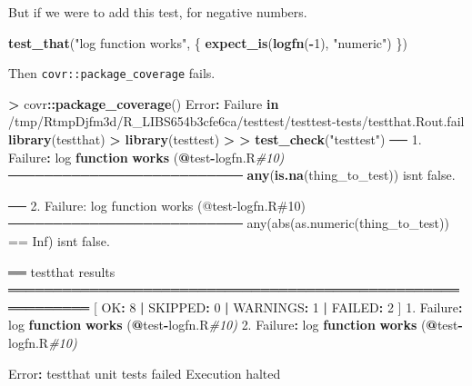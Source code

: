 \documentclass[
]{article}
\newenvironment{Shaded}{\begin{snugshade}}{\end{snugshade}}
\newcommand{\CommentTok}[1]{\textcolor[rgb]{0.56,0.35,0.01}{\textit{#1}}}
\newcommand{\ControlFlowTok}[1]{\textcolor[rgb]{0.13,0.29,0.53}{\textbf{#1}}}
\newcommand{\DataTypeTok}[1]{\textcolor[rgb]{0.13,0.29,0.53}{#1}}
\newcommand{\DecValTok}[1]{\textcolor[rgb]{0.00,0.00,0.81}{#1}}
\newcommand{\ErrorTok}[1]{\textcolor[rgb]{0.64,0.00,0.00}{\textbf{#1}}}
\newcommand{\FloatTok}[1]{\textcolor[rgb]{0.00,0.00,0.81}{#1}}
\newcommand{\KeywordTok}[1]{\textcolor[rgb]{0.13,0.29,0.53}{\textbf{#1}}}
\newcommand{\NormalTok}[1]{#1}
\newcommand{\OperatorTok}[1]{\textcolor[rgb]{0.81,0.36,0.00}{\textbf{#1}}}
\newcommand{\StringTok}[1]{\textcolor[rgb]{0.31,0.60,0.02}{#1}}
\begin{document}
But if we were to add this test, for negative numbers.

\begin{Shaded}
\begin{Highlighting}[]
\KeywordTok{test\_that}\NormalTok{(}\StringTok{"log function works"}\NormalTok{, \{}
  \KeywordTok{expect\_is}\NormalTok{(}\KeywordTok{logfn}\NormalTok{(}\OperatorTok{{-}}\DecValTok{1}\NormalTok{), }\StringTok{"numeric"}\NormalTok{)}
\NormalTok{\})}
\end{Highlighting}
\end{Shaded}

Then \texttt{covr::package\_coverage} fails.

\begin{Shaded}
\begin{Highlighting}[]
\OperatorTok{>}\StringTok{ }\NormalTok{covr}\OperatorTok{::}\KeywordTok{package\_coverage}\NormalTok{()}
\NormalTok{Error}\OperatorTok{:}\StringTok{ }\NormalTok{Failure }\ControlFlowTok{in} \StringTok{\textasciigrave{}}\DataTypeTok{/tmp/RtmpDjfm3d/R\_LIBS654b3cfe6ca/testtest/testtest{-}tests/testthat.Rout.fail}\StringTok{\textasciigrave{}}
\KeywordTok{library}\NormalTok{(testthat)}
\OperatorTok{>}\StringTok{ }\KeywordTok{library}\NormalTok{(testtest)}
\OperatorTok{>}\StringTok{ }
\ErrorTok{>}\StringTok{ }\KeywordTok{test\_check}\NormalTok{(}\StringTok{"testtest"}\NormalTok{)}
\NormalTok{── }\FloatTok{1.}\NormalTok{ Failure}\OperatorTok{:}\StringTok{ }\NormalTok{log }\ControlFlowTok{function} \KeywordTok{works}\NormalTok{ (}\OperatorTok{@}\NormalTok{test}\OperatorTok{{-}}\NormalTok{logfn.R}\CommentTok{\#10)  ──────────────────────────}
\KeywordTok{any}\NormalTok{(}\KeywordTok{is.na}\NormalTok{(thing\_to\_test)) isn}\StringTok{\textquotesingle{}t false.}

\StringTok{── 2. Failure: log function works (@test{-}logfn.R\#10)  ──────────────────────────}
\StringTok{any(abs(as.numeric(thing\_to\_test)) == Inf) isn\textquotesingle{}}\NormalTok{t false.}

\NormalTok{══ testthat results  ═══════════════════════════════════════════════════════════}
\NormalTok{[ OK}\OperatorTok{:}\StringTok{ }\DecValTok{8} \OperatorTok{|}\StringTok{ }\NormalTok{SKIPPED}\OperatorTok{:}\StringTok{ }\DecValTok{0} \OperatorTok{|}\StringTok{ }\NormalTok{WARNINGS}\OperatorTok{:}\StringTok{ }\DecValTok{1} \OperatorTok{|}\StringTok{ }\NormalTok{FAILED}\OperatorTok{:}\StringTok{ }\DecValTok{2}\NormalTok{ ]}
\FloatTok{1.}\NormalTok{ Failure}\OperatorTok{:}\StringTok{ }\NormalTok{log }\ControlFlowTok{function} \KeywordTok{works}\NormalTok{ (}\OperatorTok{@}\NormalTok{test}\OperatorTok{{-}}\NormalTok{logfn.R}\CommentTok{\#10) }
\FloatTok{2.}\NormalTok{ Failure}\OperatorTok{:}\StringTok{ }\NormalTok{log }\ControlFlowTok{function} \KeywordTok{works}\NormalTok{ (}\OperatorTok{@}\NormalTok{test}\OperatorTok{{-}}\NormalTok{logfn.R}\CommentTok{\#10) }

\NormalTok{Error}\OperatorTok{:}\StringTok{ }\NormalTok{testthat unit tests failed}
\NormalTok{Execution halted}
\end{Highlighting}
\end{Shaded}
\end{document}
